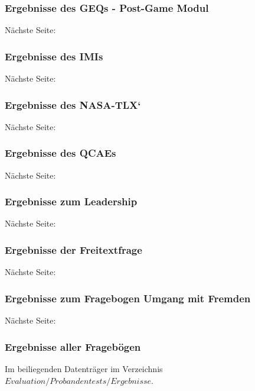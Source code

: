 \documentclass[
	12pt,
	a4paper,
	bibtotoc,
	cleardoubleempty, 
	idxtotoc,
	ngerman,
	openright
	final,
	listof=nochaptergap,
	]{scrbook}
\begin{document}
\begin{appendices}
\subsubsection{Ergebnisse des GEQs - Post-Game Modul}
Nächste Seite:


\subsubsection{Ergebnisse des IMIs}
Nächste Seite:


\subsubsection{Ergebnisse des NASA-TLX`}
Nächste Seite:


\subsubsection{Ergebnisse des QCAEs}
Nächste Seite:


\subsubsection{Ergebnisse zum Leadership}
Nächste Seite:


\subsubsection{Ergebnisse der Freitextfrage}
Nächste Seite:


\subsubsection{Ergebnisse zum Fragebogen Umgang mit Fremden}
Nächste Seite:



\subsubsection{Ergebnisse aller Fragebögen}
Im beiliegenden Datenträger im Verzeichnis $Evaluation/Probandentests/Ergebnisse$. 


\end{appendices}
\end{document}
